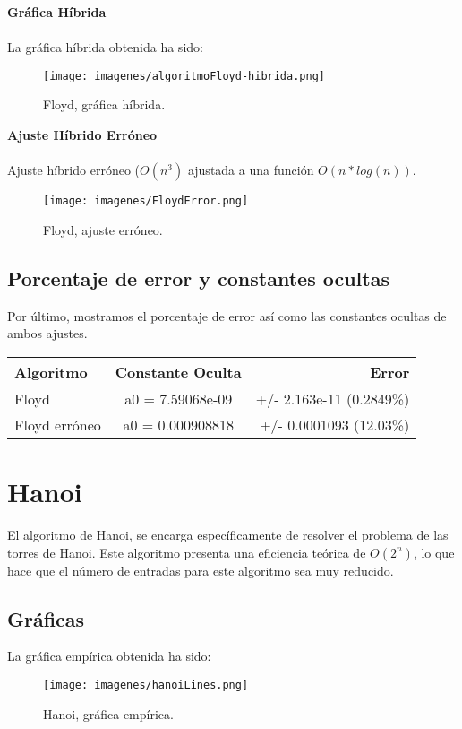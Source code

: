 \documentclass[a4paper, 11pt]{article} %
\begin{document}
\textbf{Gráfica Híbrida}\\
\\
La gráfica híbrida obtenida ha sido:
\begin{figure}[htb]
	\centering
	\texttt{[image: imagenes/algoritmoFloyd-hibrida.png]}
	\caption{Floyd, gráfica híbrida.}
	\label{fig:E17}
\end{figure}


\textbf{Ajuste Híbrido Erróneo}\\
\\
	
Ajuste híbrido erróneo ($O(n^3)$ ajustada a una función $O(n * log(n))$.
\begin{figure}[htb]
	\centering
	\texttt{[image: imagenes/FloydError.png]}
	\caption{Floyd, ajuste erróneo.}
	\label{fig:E18}
\end{figure}


\subsection{Porcentaje de error y constantes ocultas}
Por último, mostramos el porcentaje de error así como las constantes ocultas de ambos ajustes.\\
	
\begin{center}
	\begin{tabular}{| l | c | r |}
		\hline
		\textbf{Algoritmo} & \textbf{Constante Oculta} & \textbf{Error} \\ \hline
		Floyd & a0 = 7.59068e-09 & +/- 2.163e-11    (0.2849\%)\\ \hline
		Floyd erróneo & a0 = 0.000908818 & +/- 0.0001093 (12.03\%) \\ \hline
	\end{tabular}
\end{center}
	


\section{Hanoi}

El algoritmo de Hanoi, se encarga específicamente de resolver el problema de las torres de Hanoi. Este algoritmo presenta una eficiencia teórica de $O(2^n)$, lo que hace que el número de entradas para este algoritmo sea muy reducido.

\subsection{Gráficas}
La gráfica empírica obtenida ha sido:
\begin{figure}[htb]
	\centering
	\texttt{[image: imagenes/hanoiLines.png]}
	\caption{Hanoi, gráfica empírica.}
	\label{fig:E19}
\end{figure}
	
\end{document}
